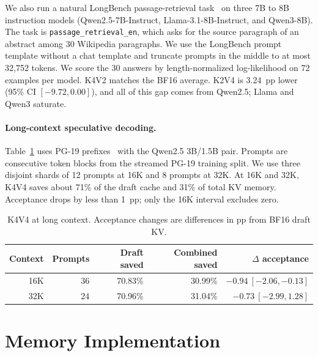 \documentclass{article}
\begin{document}
We also run a natural LongBench passage-retrieval task~\citep{bai2024longbench}
on three 7B to 8B instruction models (Qwen2.5-7B-Instruct,
Llama-3.1-8B-Instruct, and Qwen3-8B). The task is
\texttt{passage\_retrieval\_en}, which asks for the source paragraph of an
abstract among 30 Wikipedia paragraphs. We use the LongBench prompt template
without a chat template and truncate prompts in the middle to at most 32,752
tokens. We score the 30 answers by length-normalized log-likelihood on 72
examples per model. K4V2 matches the BF16 average. K2V4 is
3.24~pp lower (95\% CI $[-9.72,0.00]$), and all of this gap comes from Qwen2.5;
Llama and Qwen3 saturate.

\paragraph{Long-context speculative decoding.}
Table~\ref{tab:app-long} uses PG-19 prefixes~\citep{rae2020compressive} with the Qwen2.5 3B/1.5B pair.
Prompts are consecutive token blocks from the streamed PG-19 training split. We
use three disjoint shards of 12 prompts at 16K and 8 prompts at 32K. At 16K
and 32K, K4V4 saves about 71\% of the draft cache and 31\% of total KV memory.
Acceptance drops by less than 1~pp; only the 16K interval excludes zero.

\begin{table}[ht]
  \centering
  \small
  \caption{K4V4 at long context. Acceptance changes are differences in pp
  from BF16 draft KV.}
  \label{tab:app-long}
  \begin{tabular}{rrrrr}
    \toprule
    Context & Prompts & Draft saved & Combined saved & $\Delta$ acceptance \\
    \midrule
    16K & 36 & 70.83\% & 30.99\% & $-0.94\ [-2.06,-0.13]$ \\
    32K & 24 & 70.96\% & 31.04\% & $-0.73\ [-2.99,1.28]$ \\
    \bottomrule
  \end{tabular}
\end{table}

\section{Memory Implementation}
\label{app:systems}
\end{document}
